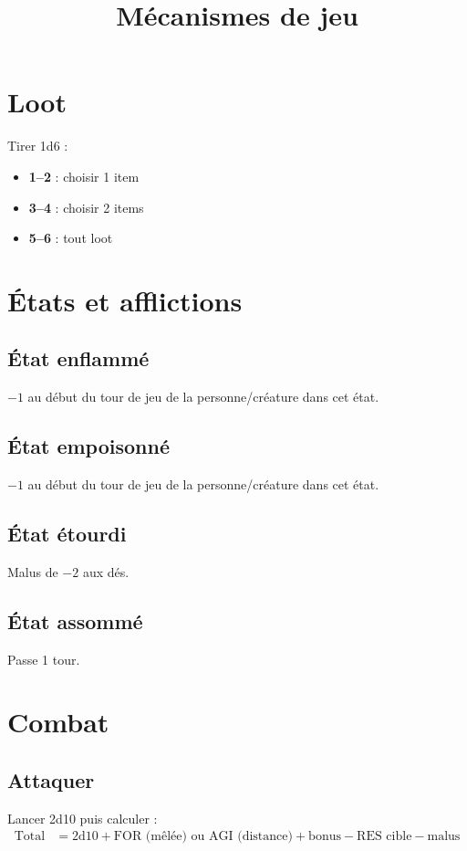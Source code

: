 \documentclass[12pt,a4paper]{article}
\title{Mécanismes de jeu}
\author{}
\date{}
\begin{document}
\maketitle

\section{Loot}
Tirer 1d6 :
\begin{itemize}[label=--]
    \item \textbf{1--2} : choisir 1 item
    \item \textbf{3--4} : choisir 2 items
    \item \textbf{5--6} : tout loot
\end{itemize}

\section{États et afflictions}

\subsection{État enflammé}
$-1$ au début du tour de jeu de la personne/créature dans cet état.

\subsection{État empoisonné}
$-1$ au début du tour de jeu de la personne/créature dans cet état.

\subsection{État étourdi}
Malus de $-2$ aux dés.

\subsection{État assommé}
Passe 1 tour.

\section{Combat}

\subsection{Attaquer}
Lancer 2d10 puis calculer :
\begin{align*}
\text{Total} &= 2\text{d}10 + \text{FOR (mêlée) ou AGI (distance)} + \text{bonus} - \text{RES cible} - \text{malus}
\end{align*}
\end{document}
